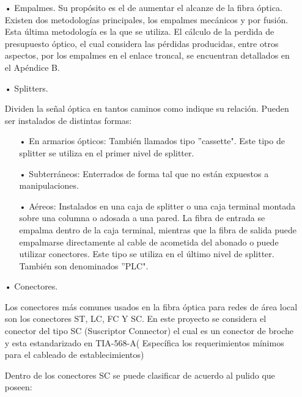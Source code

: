 \begin{enumerate}
\begin{enumerate}
\end{enumerate}


\item[•]Empalmes.
Su propósito es el de aumentar el alcanze de la fibra óptica. Existen dos metodologías principales, los empalmes mecánicos y por fusión. Esta última metodología es la que se utiliza. El cálculo de la perdida de presupuesto óptico, el cual considera las pérdidas producidas, entre otros aspectos, por los empalmes en el enlace troncal, se encuentran detallados en el Apéndice B.


\item[•]Splitters.

Dividen la señal óptica en tantos caminos como indique su relación. Pueden ser instalados de distintas formas:
\begin{enumerate}
\item[•]En armarios ópticos: También llamados tipo ''cassette". Este tipo de splitter se utiliza en el primer nivel de splitter.
\item[•]Subterráneos: Enterrados de forma tal que no están expuestos a manipulaciones.
\item[•]Aéreos: Instalados en una caja de splitter o una caja terminal montada sobre una columna o adosada a una pared. La fibra de entrada se empalma dentro de la caja terminal, mientras que la fibra de salida puede empalmarse directamente al cable de acometida del abonado o puede utilizar conectores. Este tipo se utiliza en el último nivel de splitter. También son denominados ''PLC".

\end{enumerate}




\item[•]Conectores.


Los conectores más comunes usados en la fibra óptica para redes de área local son los conectores ST, LC, FC Y SC. En este proyecto se considera el conector del tipo SC (Suscriptor Connector) el cual es un conector de broche y esta estandarizado en TIA-568-A( Específica los requerimientos mínimos para el cableado de 
establecimientos)

Dentro de los conectores SC se puede clasificar de acuerdo al pulido que poseen:


\end{enumerate}
